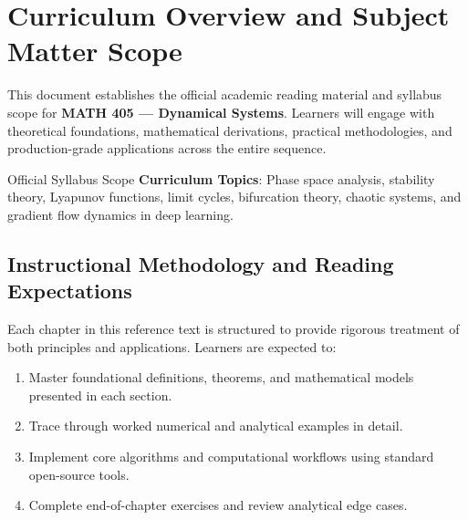 \section{Curriculum Overview and Subject Matter Scope}

This document establishes the official academic reading material and syllabus scope for \textbf{MATH 405 --- Dynamical Systems}. Learners will engage with theoretical foundations, mathematical derivations, practical methodologies, and production-grade applications across the entire sequence.

\begin{InsightBox}{Official Syllabus Scope}
  \textbf{Curriculum Topics}: Phase space analysis, stability theory, Lyapunov functions, limit cycles, bifurcation theory, chaotic systems, and gradient flow dynamics in deep learning.
\end{InsightBox}

\subsection{Instructional Methodology and Reading Expectations}

Each chapter in this reference text is structured to provide rigorous treatment of both principles and applications. Learners are expected to:
\begin{enumerate}
  \item Master foundational definitions, theorems, and mathematical models presented in each section.
  \item Trace through worked numerical and analytical examples in detail.
  \item Implement core algorithms and computational workflows using standard open-source tools.
  \item Complete end-of-chapter exercises and review analytical edge cases.
\end{enumerate}

